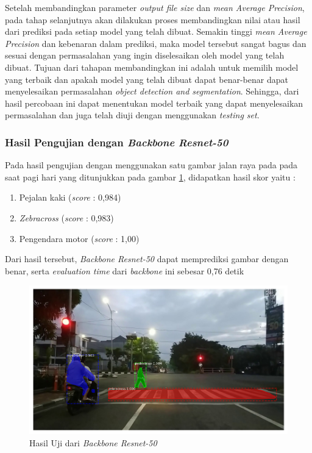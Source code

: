 Setelah membandingkan parameter \textit{output file size} dan \textit{mean Average Precision}, pada tahap selanjutnya akan dilakukan proses membandingkan nilai atau hasil dari prediksi pada setiap model yang telah dibuat. Semakin tinggi \textit{mean Average Precision} dan kebenaran dalam prediksi, maka model tersebut sangat bagus dan sesuai dengan permasalahan yang ingin diselesaikan oleh model yang telah dibuat. Tujuan dari tahapan membandingkan ini adalah untuk memilih model yang terbaik dan apakah model yang telah dibuat dapat benar-benar dapat menyelesaikan permasalahan \textit{object detection and segmentation}. Sehingga, dari hasil percobaan ini dapat menentukan model terbaik yang dapat menyelesaikan permasalahan dan juga telah diuji dengan menggunakan\textit{ testing set}.

\subsubsection{Hasil Pengujian dengan \textit{Backbone Resnet-50}}

Pada hasil pengujian dengan menggunakan satu gambar jalan raya pada pada saat pagi hari yang ditunjukkan pada gambar \ref{fig:hasil-resnet50}, didapatkan hasil skor yaitu :
\begin{enumerate}[nolistsep]
	\item Pejalan kaki (\textit{score} : 0,984)
	\item \textit{Zebracross} (\textit{score} : 0,983)
	\item Pengendara motor (\textit{score} : 1,00)
\end{enumerate}
Dari hasil tersebut, \textit{Backbone Resnet-50} dapat memprediksi gambar dengan benar, serta \textit{evaluation time} dari \textit{backbone} ini sebesar 0,76 detik
\begin{figure}[h] 
	\centering
	\includegraphics[scale=0.3]{gambar/fajar-frame800-resnet50.png}
	\caption{Hasil Uji dari \textit{Backbone Resnet-50}}
	\label{fig:hasil-resnet50}
\end{figure}

